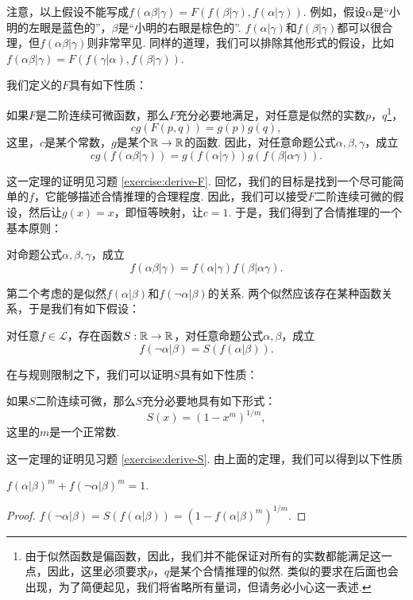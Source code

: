 注意，以上假设不能写成$f(\alpha\beta|\gamma) = F(f(\beta|\gamma), f(\alpha|\gamma))$. 例如，假设$\alpha$是“小明的左眼是蓝色的”，$\beta$是“小明的右眼是棕色的”. $f(\alpha|\gamma)$和$f(\beta|\gamma)$都可以很合理，但$f(\alpha\beta|\gamma)$则非常罕见. 同样的道理，我们可以排除其他形式的假设，比如$f(\alpha\beta|\gamma) = F(f(\gamma|\alpha), f(\beta|\gamma))$.

我们定义的$F$具有如下性质：
\begin{theorem}\label{theorem:form-of-F}
    如果$F$是二阶连续可微函数，那么$F$充分必要地满足，对任意是似然的实数$p$，$q$\footnote{由于似然函数是偏函数，因此，我们并不能保证对所有的实数都能满足这一点，因此，这里必须要求$p$，$q$是某个合情推理的似然. 类似的要求在后面也会出现，为了简便起见，我们将省略所有量词，但请务必小心这一表述. }，
        \[cg(F(p,q))=g(p)g(q),\]
        这里，$c$是某个常数，$g$是某个$\mathbb{R}\to\mathbb{R}$的函数.
        因此，对任意命题公式$\alpha,\beta,\gamma$，成立
        \[cg(f(\alpha\beta|\gamma))=g(f(\alpha|\gamma))g(f(\beta|\alpha\gamma)).\]
\end{theorem}

这一定理的证明见习题 \ref{exercise:derive-F}. 回忆，我们的目标是找到一个尽可能简单的$f$，它能够描述合情推理的合理程度. 因此，我们可以接受$F$二阶连续可微的假设，然后让$g(x)=x$，即恒等映射，让$c=1$. 于是，我们得到了合情推理的一个基本原则：
\begin{principle}[与规则]
对命题公式$\alpha,\beta,\gamma$，成立
\[f(\alpha\beta|\gamma)=f(\alpha|\gamma)f(\beta|\alpha\gamma).\]
\end{principle}

第二个考虑的是似然$f(\alpha|\beta)$和$f(\neg\alpha|\beta)$的关系. 两个似然应该存在某种函数关系，于是我们有如下假设：

\begin{hypothesis}
    对任意$f\in\mathcal L$，存在函数$S:\mathbb{R}\to\mathbb{R}$，对任意命题公式$\alpha,\beta$，成立
    \[f(\neg\alpha|\beta)=S(f(\alpha|\beta)).\]
\end{hypothesis}

在与规则限制之下，我们可以证明$S$具有如下性质：
\begin{theorem}\label{theorem:form-of-S}
    如果$S$二阶连续可微，那么$S$充分必要地具有如下形式：
    \begin{equation*}
        S(x) = (1 - x^m)^{1/m},
    \end{equation*}
    这里的$m$是一个正常数.
\end{theorem}

这一定理的证明见习题 \ref{exercise:derive-S}. 由上面的定理，我们可以得到以下性质
\begin{corollary}
    $f(\alpha|\beta)^m + f(\neg\alpha|\beta)^m = 1$.
\end{corollary}
\begin{proof}
    $f(\neg\alpha|\beta) = S(f(\alpha|\beta)) = (1 - f(\alpha|\beta)^m)^{1/m}$.
\end{proof}

